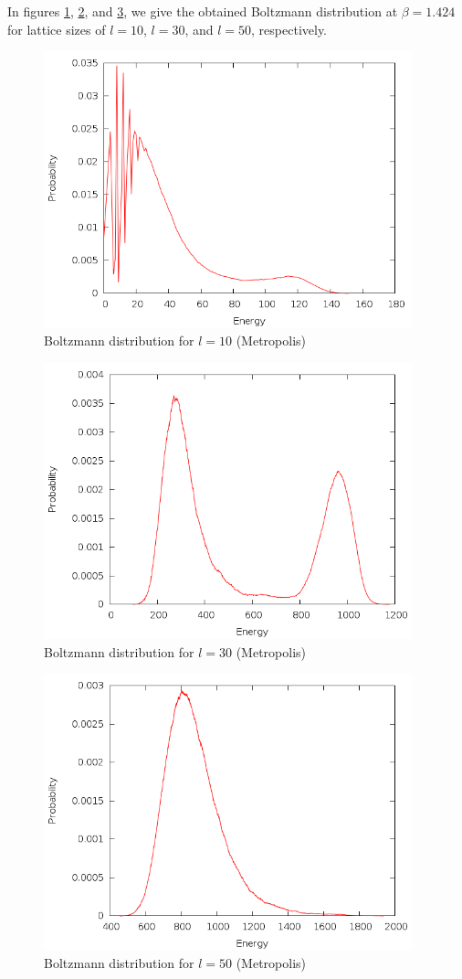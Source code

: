 \documentclass{article}
\begin{document}
In figures \ref{fig:m10}, \ref{fig:m30}, and \ref{fig:m50}, we give the obtained Boltzmann distribution at $\beta = 1.424$ for lattice sizes of $l = 10$, $l = 30$, and $l = 50$, respectively.

\begin{figure}[h]
\includegraphics[height=8cm]{../results/metropolis/m10.png}
\caption{Boltzmann distribution for $l = 10$ (Metropolis)}
\label{fig:m10}
\end{figure}

\begin{figure}[h]
\includegraphics[height=8cm]{../results/metropolis/m30.png}
\caption{Boltzmann distribution for $l = 30$ (Metropolis)}
\label{fig:m30}
\end{figure}

\begin{figure}[h]
\includegraphics[height=8cm]{../results/metropolis/m50.png}
\caption{Boltzmann distribution for $l = 50$ (Metropolis)}
\label{fig:m50}
\end{figure}
\end{document}
